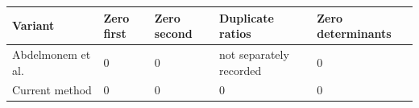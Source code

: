\begin{tabular}{lllll}
\hline
Variant & Zero first & Zero second & Duplicate ratios & Zero determinants \\
\hline
Abdelmonem et al. & 0 & 0 & not separately recorded & 0 \\
Current method & 0 & 0 & 0 & 0 \\
\hline
\end{tabular}
